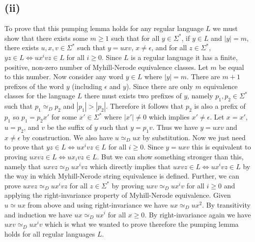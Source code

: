 \documentclass[12pt]{article}
\begin{document}
\subsection*{(ii)}
To prove that this pumping lemma holds for any regular language $L$ we must show
that there exists some $m \ge 1$ such that for all $y \in \Sigma^*$,
if $y \in L$ and $|y| = m$, there exists $u,x,v \in \Sigma^*$ such that
$y = uxv$, $x \neq \epsilon$, and for all $z \in \Sigma^*$,
$yz \in L \iff ux^ivz \in L$ for all $i \ge 0$. Since $L$ is a regular language
it has a finite, positive, non-zero number of Myhill-Nerode equivalence classes.
Let $m$ be equal to this number. Now consider any word $y \in L$ where $|y| = m$.
There are $m+1$ prefixes of the word $y$ (including $\epsilon$ and $y$). Since
there are only $m$ equivalence classes for the language $L$ there must exists
two prefixes of $y$, namely $p_1,p_2 \in \Sigma^*$ such that $p_1 \simeq_D p_2$
and $|p_1| > |p_2|$. Therefore it follows that $p_2$ is also a prefix of $p_1$
so $p_1 = p_2x'$ for some $x' \in \Sigma^*$ where $|x'| \neq 0$ which implies
$x' \neq \epsilon$. Let $x=x'$, $u=p_2$, and $v$ be the suffix of $y$
such that $y=p_1v$. Thus we have $y = uxv$ and $x \neq \epsilon$ by construction.
We also have $u \simeq_D ux$ by substitution. Now we just need to prove that
$yz \in L \iff ux^ivz \in L$ for all $i \ge 0$.
Since $y = uxv$ this is equivalent to proving $uxvz \in L \iff ux_ivz \in L$.
But we can show something stronger than this, namely that $uxvz \simeq_D ux^ivz$
which directly implies that $uxvz \in L \iff ux^ivz \in L$ by the way in which
Myhill-Nerode string equivalence is defined. Further, we can prove
$uxvz \simeq_D ux^ivz$ for all $z \in \Sigma^*$ by proving $uxv \simeq_D ux^iv$
for all $i \ge 0$ and applying the right-invariance property of Myhill-Nerode
equivalence. Given $u \simeq ux$ from above and using right-invariance we have
$ux \simeq_D ux^2$. By transitivity and induction we have $ux \simeq_D ux^i$
for all $x \ge 0$. By right-invariance again we have $uxv \simeq_D ux^iv$ which
is what we wanted to prove therefore the pumping lemma holds for all regular
languages $L$.
\end{document}

